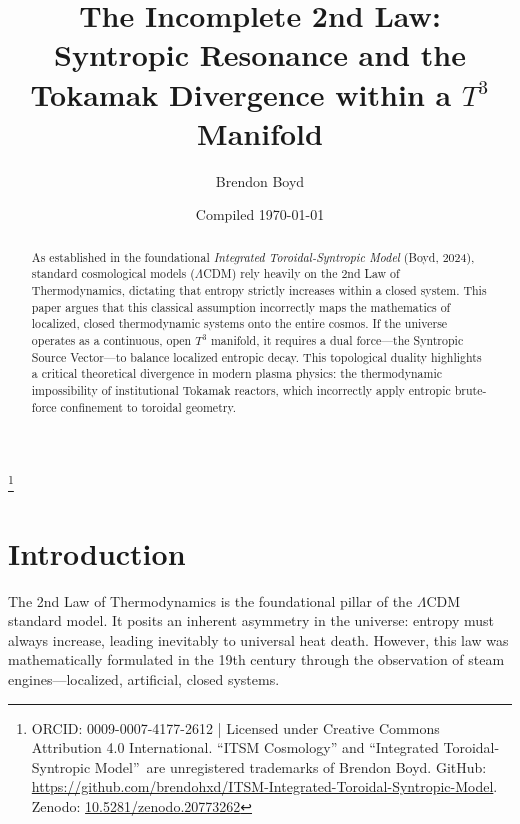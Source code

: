 \documentclass[aps,prd,11pt,onecolumn,superscriptaddress,nofootinbib,floatfix]{revtex4-2}
\begin{document}
\title{The Incomplete 2nd Law: \\ Syntropic Resonance and the Tokamak Divergence within a $T^3$ Manifold}
\author{Brendon Boyd}
\thanks{ORCID: 0009-0007-4177-2612 | Licensed under Creative Commons Attribution 4.0 International. ``ITSM Cosmology'' and ``Integrated Toroidal-Syntropic Model''\texttrademark\ are unregistered trademarks of Brendon Boyd. GitHub: \url{https://github.com/brendohxd/ITSM-Integrated-Toroidal-Syntropic-Model}. Zenodo: \href{https://doi.org/10.5281/zenodo.20773262}{10.5281/zenodo.20773262}}
\date{Compiled \today}

\begin{abstract}
As established in the foundational \textit{Integrated Toroidal-Syntropic Model} (Boyd, 2024), standard cosmological models ($\Lambda$CDM) rely heavily on the 2nd Law of Thermodynamics, dictating that entropy strictly increases within a closed system. This paper argues that this classical assumption incorrectly maps the mathematics of localized, closed thermodynamic systems onto the entire cosmos. If the universe operates as a continuous, open $T^3$ manifold, it requires a dual force—the Syntropic Source Vector—to balance localized entropic decay. This topological duality highlights a critical theoretical divergence in modern plasma physics: the thermodynamic impossibility of institutional Tokamak reactors, which incorrectly apply entropic brute-force confinement to toroidal geometry.
\end{abstract}

\maketitle

\section{Introduction}
\label{sec:intro}

The 2nd Law of Thermodynamics is the foundational pillar of the $\Lambda$CDM standard model. It posits an inherent asymmetry in the universe: entropy must always increase, leading inevitably to universal heat death. However, this law was mathematically formulated in the 19th century through the observation of steam engines—localized, artificial, closed systems. 
\end{document}
